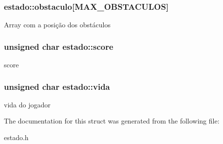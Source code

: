 \subsubsection[{\texorpdfstring{obstaculo}{obstaculo}}]{ estado\+::obstaculo\mbox{[}M\+A\+X\+\_\+\+O\+B\+S\+T\+A\+C\+U\+L\+OS\mbox{]}}\hypertarget{structestado_a970dc20c6687acb17c3f08c06edbed4f}{}\label{structestado_a970dc20c6687acb17c3f08c06edbed4f}
Array com a posição dos obstáculos 
\subsubsection[{\texorpdfstring{score}{score}}]{\setlength{\rightskip}{0pt plus 5cm}unsigned char estado\+::score}\hypertarget{structestado_ac43134202ba42a5db42a1c5a2cf7ffee}{}\label{structestado_ac43134202ba42a5db42a1c5a2cf7ffee}
score 
\subsubsection[{\texorpdfstring{vida}{vida}}]{\setlength{\rightskip}{0pt plus 5cm}unsigned char estado\+::vida}\hypertarget{structestado_a97b6a91e8e39dcc45100daf2160a681e}{}\label{structestado_a97b6a91e8e39dcc45100daf2160a681e}
vida do jogador 

The documentation for this struct was generated from the following file\+:\begin{DoxyCompactItemize}
\item 
estado.\+h\end{DoxyCompactItemize}
